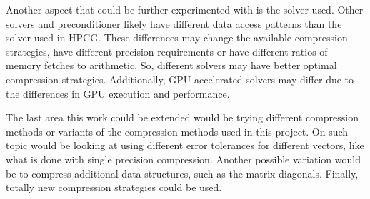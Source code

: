 Another aspect that could be further experimented with is the solver used.
Other solvers and preconditioner likely have different data access patterns than the solver used in HPCG.
These differences may change the available compression strategies, have different precision requirements or have different ratios of memory fetches to arithmetic.
So, different solvers may have better optimal compression strategies.
Additionally, GPU accelerated solvers may differ due to the differences in GPU execution and performance.

The last area this work could be extended would be trying different compression methods or variants of the compression methods used in this project.
On such topic would be looking at using different error tolerances for different vectors, like what is done with single precision compression.
Another possible variation would be to compress additional data structures, such as the matrix diagonals.
Finally, totally new compression strategies could be used.

